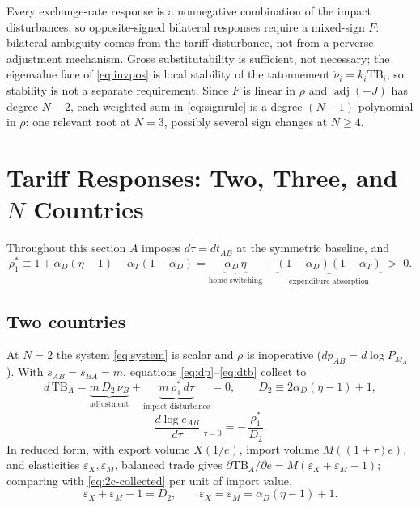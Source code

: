 \documentclass[11pt]{article}
\begin{document}
\noindent Every exchange-rate response is a nonnegative combination of the impact disturbances, so opposite-signed bilateral responses require a mixed-sign $F$: bilateral ambiguity comes from the tariff disturbance, not from a perverse adjustment mechanism. Gross substitutability is sufficient, not necessary; the eigenvalue face of \eqref{eq:invpos} is local stability of the tatonnement $\dot\nu_i = k_i \mathrm{TB}_i$, so stability is not a separate requirement. Since $F$ is linear in $\rho$ and $\operatorname{adj}(-J)$ has degree $N-2$, each weighted sum in \eqref{eq:signrule} is a degree-$(N-1)$ polynomial in $\rho$: one relevant root at $N = 3$, possibly several sign changes at $N \geq 4$.

\section{Tariff Responses: Two, Three, and $N$ Countries}

Throughout this section $A$ imposes $d\tau = dt_{AB}$ at the symmetric baseline, and
\begin{equation}
\rho_1^*
\equiv 1 + \alpha_D(\eta-1) - \alpha_T(1-\alpha_D)
= \underbrace{\alpha_D\,\eta}_{\text{home switching}} + \underbrace{(1-\alpha_D)(1-\alpha_T)}_{\text{expenditure absorption}}
\;>\; 0 .
\label{eq:rho1-identity}
\end{equation}

\subsection{Two countries}

At $N = 2$ the system \eqref{eq:system} is scalar and $\rho$ is inoperative ($dp_{AB} = d\log P_{M_A}$). With $s_{AB} = s_{BA} = m$, equations \eqref{eq:dp}--\eqref{eq:dtb} collect to
\begin{equation}
d\,\mathrm{TB}_A
= \underbrace{m\, D_2\, \nu_B}_{\text{adjustment}}
+ \underbrace{m\, \rho_1^*\, d\tau}_{\text{impact disturbance}}
= 0,
\qquad
D_2 \equiv 2\alpha_D(\eta-1) + 1 ,
\label{eq:2c-collected}
\end{equation}
\begin{equation}
\boxed{\;
\frac{d\log e_{AB}}{d\tau}\bigg|_{\tau=0}
= -\,\frac{\rho_1^*}{D_2} .
\;}
\label{eq:2c-slope}
\end{equation}
In reduced form, with export volume $X(1/e)$, import volume $M((1+\tau)e)$, and elasticities $\varepsilon_X, \varepsilon_M$, balanced trade gives $\partial \mathrm{TB}_A/\partial e = M(\varepsilon_X + \varepsilon_M - 1)$; comparing with \eqref{eq:2c-collected} per unit of import value,
\begin{equation}
\varepsilon_X + \varepsilon_M - 1 = D_2,
\qquad
\varepsilon_X = \varepsilon_M = \alpha_D(\eta-1) + 1 .
\label{eq:ml-D2}
\end{equation}
\end{document}

